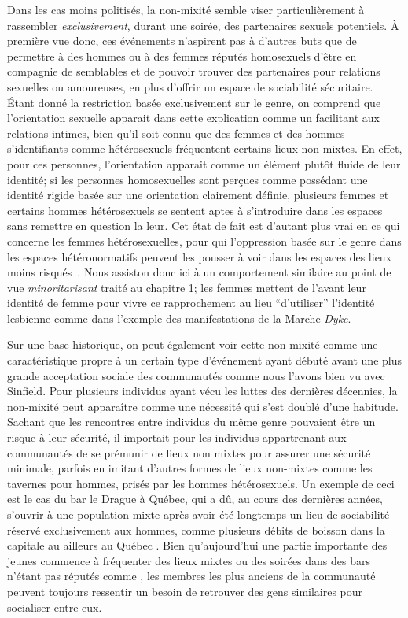 Dans les cas moins politisés, la non-mixité semble viser particulièrement à rassembler \emph{exclusivement}, durant une soirée, des partenaires sexuels potentiels.
À première vue donc, ces événements n'aspirent pas à d'autres buts que de permettre à des hommes ou à des femmes réputés homosexuels d'être en compagnie de semblables et de pouvoir trouver des partenaires pour relations sexuelles ou amoureuses, en plus d'offrir un espace de sociabilité sécuritaire.
Étant donné la restriction basée exclusivement sur le genre, on comprend que l'orientation sexuelle apparait dans cette explication comme un facilitant aux relations intimes, bien qu'il soit connu que des femmes et des hommes s'identifiants comme hétérosexuels fréquentent certains lieux non mixtes.
En effet, pour ces personnes, l'orientation apparait comme un élément plutôt fluide de leur identité; si les personnes homosexuelles sont perçues comme possédant une identité rigide basée sur une orientation clairement définie, plusieurs femmes et certains hommes hétérosexuels se sentent aptes à s'introduire dans les espaces \lgbt{} sans remettre en question la leur.
Cet état de fait est d'autant plus vrai en ce qui concerne les femmes hétérosexuelles, pour qui l'oppression basée sur le genre dans les espaces hétéronormatifs peuvent les pousser à voir dans les espaces \lgbt{} des lieux moins risqués~\citep[][9]{Bettani2014}.
Nous assiston donc ici à un comportement similaire au point de vue \emph{minoritarisant} traité au chapitre 1; les femmes mettent de l'avant leur identité de femme pour vivre ce rapprochement au lieu \enquote{d'utiliser} l'identité lesbienne comme dans l'exemple des manifestations de la Marche \emph{Dyke}.

Sur une base historique, on peut également voir cette non-mixité comme une caractéristique propre à un certain type d'événement ayant débuté avant une plus grande acceptation sociale des communautés \lgbt{} comme nous l'avons bien vu avec Sinfield.
Pour plusieurs individus \lgbt{} ayant vécu les luttes \lgbt{} des dernières décennies, la non-mixité peut apparaître comme une nécessité qui s'est doublé d'une habitude.
Sachant que les rencontres entre individus du même genre pouvaient être un risque à leur sécurité, il importait pour les individus appartrenant aux  communautés \lgbt{} de se prémunir de lieux non mixtes pour assurer une sécurité minimale, parfois en imitant d'autres formes de lieux non-mixtes comme les tavernes pour hommes, prisés par les hommes hétérosexuels.
Un exemple de ceci est le cas du bar le Drague à Québec, qui a dû, au cours des dernières années, s'ouvrir à une population mixte après avoir été longtemps un lieu de sociabilité réservé exclusivement aux hommes, comme plusieurs débits de boisson dans la capitale au ailleurs au Québec \missref{}.
Bien qu'aujourd'hui une partie importante des jeunes \lgbt{} commence à fréquenter des lieux mixtes ou des soirées dans des bars n'étant pas réputés comme \lgbt{}, les membres les plus anciens de la communauté peuvent toujours ressentir un besoin de retrouver des gens similaires pour socialiser entre eux.

